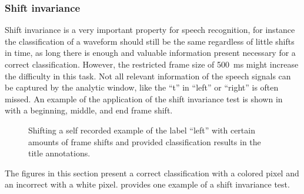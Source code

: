 \subsubsection{Shift invariance}
Shift invariance is a very important property for speech recognition, for instance the classification of a waveform should still be the same regardless of little shifts in time, as long there is enough and valuable information present necessary for a correct classification.
However, the restricted frame size of \SI{500}{\milli\second} might increase the difficulty in this task.
Not all relevant information of the speech signals can be captured by the analytic window, like the \enquote{t} in \enquote{left} or \enquote{right} is often missed.
An example of the application of the shift invariance test is shown in  with a beginning, middle, and end frame shift.
\begin{figure}[!ht]
  \centering
  \caption{Shifting a self recorded example of the label \enquote{left} with certain amounts of frame shifts and provided classification results in the title annotations.}
  \label{fig:exp_details_tb_shift_left}
\end{figure}
\FloatBarrier
\noindent
The figures in this section present a correct classification with a colored pixel and an incorrect with a white pixel.
 provides one example of a shift invariance test.
